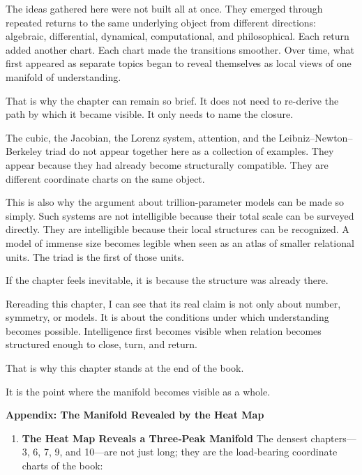\documentclass[
]{article}
\providecommand{\tightlist}{%
  \setlength{\itemsep}{0pt}\setlength{\parskip}{0pt}}
\begin{document}
The ideas gathered here were not built all at once. They emerged through
repeated returns to the same underlying object from different
directions: algebraic, differential, dynamical, computational, and
philosophical. Each return added another chart. Each chart made the
transitions smoother. Over time, what first appeared as separate topics
began to reveal themselves as local views of one manifold of
understanding.

That is why the chapter can remain so brief. It does not need to
re-derive the path by which it became visible. It only needs to name the
closure.

The cubic, the Jacobian, the Lorenz system, attention, and the
Leibniz--Newton--Berkeley triad do not appear together here as a
collection of examples. They appear because they had already become
structurally compatible. They are different coordinate charts on the
same object.

This is also why the argument about trillion-parameter models can be
made so simply. Such systems are not intelligible because their total
scale can be surveyed directly. They are intelligible because their
local structures can be recognized. A model of immense size becomes
legible when seen as an atlas of smaller relational units. The triad is
the first of those units.

If the chapter feels inevitable, it is because the structure was already
there.

Rereading this chapter, I can see that its real claim is not only about
number, symmetry, or models. It is about the conditions under which
understanding becomes possible. Intelligence first becomes visible when
relation becomes structured enough to close, turn, and return.

That is why this chapter stands at the end of the book.

It is the point where the manifold becomes visible as a whole.

\newpage
\vspace*{2cm}

\noindent\textbf{\large Appendix: The Manifold Revealed by the Heat Map}

\begin{enumerate}
\def\labelenumi{\arabic{enumi}.}
\tightlist
\item
  \textbf{The Heat Map Reveals a Three‑Peak Manifold} The densest
  chapters---3, 6, 7, 9, and 10---are not just long; they are the
  load‑bearing coordinate charts of the book:
\end{enumerate}
\end{document}
